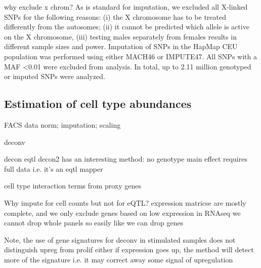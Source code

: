 why exclude x chrom?
As is standard for imputation, we excluded all X-linked SNPs for the following reasons: (i) the X chromosome has to be treated differently from the autosomes; (ii) it cannot be predicted which allele is active on the X chromosome, (iii) testing males separately from females results in different sample sizes and power. Imputation of SNPs in the HapMap CEU population was performed using either MACH46 or IMPUTE47. All SNPs with a MAF <0.01 were excluded from analysis. In total, up to 2.11 million genotyped or imputed SNPs were analyzed.

\subsection{Estimation of cell type abundances}

FACS data norm; imputation; scaling

deconv

    decon eqtl
        decon2 has an interesting method: no genotype main effect
        requires full data i.e. it's an eqtl mapper

    cell type interaction terms from proxy genes


Why impute for cell counts but not for eQTL?
expression matricse are mostly complete, and we only exclude genes based on low expression in RNAseq
we cannot drop whole panels so easily like we can drop genes

Note, the use of gene signatures for deconv
    in stimulated samples
    does not distinguish upreg from prolif either
    if expression goes up, the method will detect more of the signature
    i.e. it may correct away some signal of upregulation


